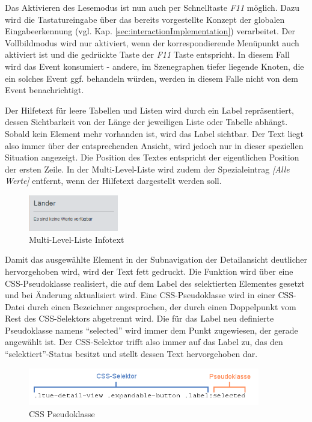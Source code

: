 Das Aktivieren des Lesemodus ist nun auch per Schnelltaste \textit{F11} möglich. Dazu wird die Tastatureingabe über das bereits vorgestellte Konzept der globalen Eingabeerkennung (vgl. Kap. \ref{sec:interactionImplementation}) verarbeitet. Der Vollbildmodus wird nur aktiviert, wenn der korrespondierende Menüpunkt auch aktiviert ist und die gedrückte Taste der \textit{F11} Taste entspricht. In diesem Fall wird das Event konsumiert - andere, im Szenegraphen tiefer liegende Knoten, die ein solches Event ggf. behandeln würden, werden in diesem Falle nicht von dem Event benachrichtigt.\par
{}
Der Hilfetext für leere Tabellen und Listen wird durch ein Label repräsentiert, dessen Sichtbarkeit von der Länge der jeweiligen Liste oder Tabelle abhängt. Sobald kein Element mehr vorhanden ist, wird das Label sichtbar. Der Text liegt also immer über der entsprechenden Ansicht, wird jedoch nur in dieser speziellen Situation angezeigt. Die Position des Textes entspricht der eigentlichen Position der ersten Zeile. In der Multi-Level-Liste wird zudem der Spezialeintrag \textit{[Alle Werte]} entfernt, wenn der Hilfetext dargestellt werden soll.\par
\begin{figure}[H]
 \centering
 \includegraphics[width=0.35\textwidth]{grafiken/mll_no_values.png}
 \caption{Multi-Level-Liste Infotext}
 \label{fig:mllNoValues}
\end{figure}
Damit das ausgewählte Element in der Subnavigation der Detailansicht deutlicher hervorgehoben wird, wird der Text fett gedruckt. Die Funktion wird über eine CSS-Pseudoklasse realisiert, die auf dem Label des selektierten Elementes gesetzt und bei Änderung aktualisiert wird. Eine CSS-Pseudoklasse wird in einer CSS-Datei durch einen Bezeichner angesprochen, der durch einen Doppelpunkt vom Rest des CSS-Selektors abgetrennt wird. Die für das Label neu definierte Pseudoklasse namens \enquote{selected} wird immer dem Punkt zugewiesen, der gerade angewählt ist. Der CSS-Selektor trifft also immer auf das Label zu, das den \enquote{selektiert}-Status besitzt und stellt dessen Text hervorgehoben dar.\par
\begin{figure}[H]
 \centering
 \includegraphics[width=0.9\textwidth]{grafiken/pseudoklasse.png}
 \caption{CSS Pseudoklasse}
 \label{fig:cssPseudoclass}
\end{figure}
